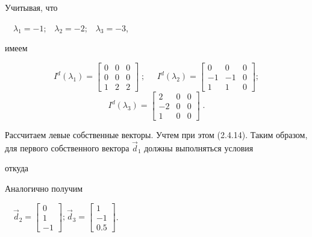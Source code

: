 		Учитывая, что



		\ \  $\lambda _1=-1;\;\;\;\lambda _2=-2;\;\;\;\lambda _3=-3$,



		имеем


\begin{equation*}
I^d(\lambda _1)=\left[\begin{matrix}0&0&0\\0&0&0\\1&2&2\end{matrix}\right]\;;\;\;\;\;\;I^d(\lambda _2)=\left[\begin{matrix}0&0&0\\-1&-1&0\\1&1&0\end{matrix}\right];
\end{equation*}
\begin{equation*}
I^d(\lambda _3)=\left[\begin{matrix}2&0&0\\-2&0&0\\1&0&0\end{matrix}\right]\;.
\end{equation*}

		Рассчитаем левые собственные векторы. Учтем при этом (2.4.14). Таким образом, для первого собственного вектора  $\vec
		d_1$ должны выполняться условия




		откуда 






		Аналогично получим



		\ \  $\vec d_2=\left[\begin{matrix}0\\1\\-1\end{matrix}\right];_{}^{}\vec
		d_3=\left[\begin{matrix}1\\-1\\0.5\end{matrix}\right]$.



